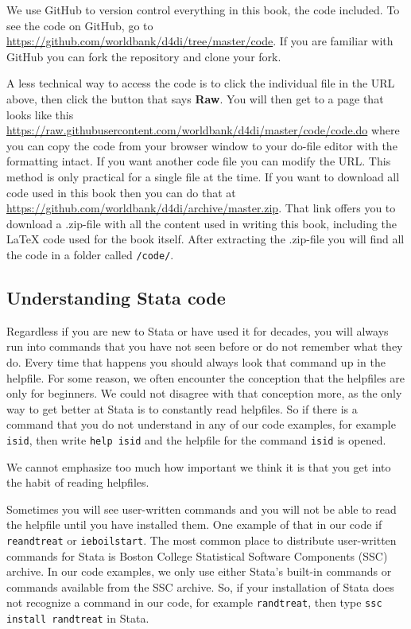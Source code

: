 We use GitHub to version control everything in this book, the code included. To see the code on GitHub, go to
\url{https://github.com/worldbank/d4di/tree/master/code}. If you are familiar with GitHub you can
fork the repository and clone your fork.

A less technical way to access the code is to click the individual file in the URL above, then click
the button that says \textbf{Raw}. You will then get to a page that looks like this
\url{https://raw.githubusercontent.com/worldbank/d4di/master/code/code.do} where you can copy the code
from your browser window to your do-file editor with the formatting intact.
If you want another code file you can modify the URL. This method is only practical for a
single file at the time. If you want to download all code used in this book then you can do that at
\url{https://github.com/worldbank/d4di/archive/master.zip}. That link offers you to download a .zip-file
with all the content used in writing this book, including the \LaTeX{} code used for the book itself. After
extracting the .zip-file you will find all the code in a folder called \texttt{/code/}.

\subsection{Understanding Stata code}

Regardless if you are new to Stata or have used it for decades, you will always run into commands that
you have not seen before or do not remember what they do. Every time that happens you should always look
that command up in the helpfile. For some reason, we often encounter the conception that the helpfiles
are only for beginners. We could not disagree with that conception more, as the only way to get better at Stata
is to constantly read helpfiles. So if there is a command that you do not understand in any of our code
examples, for example \texttt{isid}, then write \verb+help isid+ and the helpfile for the
command \texttt{isid} is opened.

We cannot emphasize too much how important we think it is that you get into the habit of reading helpfiles.

Sometimes you will see user-written commands and you will not be able to read the helpfile until you have
installed them. One example of that in our code if \texttt{reandtreat} or \texttt{ieboilstart}. The
most common place to distribute user-written commands for Stata is Boston College Statistical Software Components
(SSC) archive. In our code examples, we only use either Stata's built-in commands or commands available from the
SSC archive. So, if your installation of Stata does not recognize a command in our code, for example
\texttt{randtreat}, then type \verb+ssc install randtreat+ in Stata.

